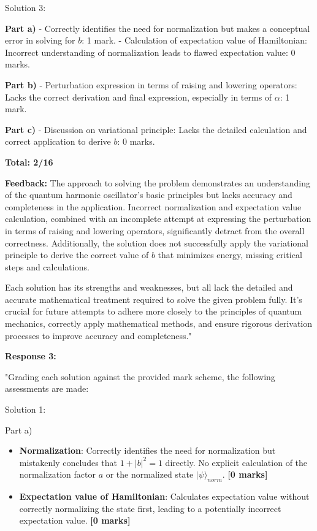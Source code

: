 \documentclass[a4paper,11pt]{article}
\begin{document}
Solution 3:

\textbf{Part a)}  
- Correctly identifies the need for normalization but makes a conceptual error in solving for $b$: 1 mark.  
- Calculation of expectation value of Hamiltonian: Incorrect understanding of normalization leads to flawed expectation value: 0 marks.

\textbf{Part b)}  
- Perturbation expression in terms of raising and lowering operators: Lacks the correct derivation and final expression, especially in terms of $\alpha$: 1 mark.

\textbf{Part c)}  
- Discussion on variational principle: Lacks the detailed calculation and correct application to derive $b$: 0 marks.

\textbf{Total: 2/16}

\textbf{Feedback:}  
The approach to solving the problem demonstrates an understanding of the quantum harmonic oscillator's basic principles but lacks accuracy and completeness in the application. Incorrect normalization and expectation value calculation, combined with an incomplete attempt at expressing the perturbation in terms of raising and lowering operators, significantly detract from the overall correctness. Additionally, the solution does not successfully apply the variational principle to derive the correct value of $b$ that minimizes energy, missing critical steps and calculations.

Each solution has its strengths and weaknesses, but all lack the detailed and accurate mathematical treatment required to solve the given problem fully. It's crucial for future attempts to adhere more closely to the principles of quantum mechanics, correctly apply mathematical methods, and ensure rigorous derivation processes to improve accuracy and completeness."

\textbf{Response 3:}

"Grading each solution against the provided mark scheme, the following assessments are made:

Solution 1:

Part a)

\begin{itemize}
    \item \textbf{Normalization}: Correctly identifies the need for normalization but mistakenly concludes that \(1 + |b|^2 = 1\) directly. No explicit calculation of the normalization factor \(a\) or the normalized state \(|\psi\rangle_{norm}\). \textbf{[0 marks]}
    \item \textbf{Expectation value of Hamiltonian}: Calculates expectation value without correctly normalizing the state first, leading to a potentially incorrect expectation value. \textbf{[0 marks]}
\end{itemize}
\end{document}

